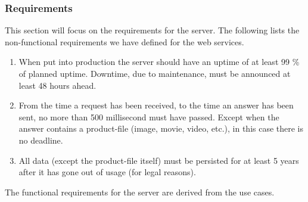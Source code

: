 \subsubsection{Requirements}
\label{s_serviceRequirements}
This section will focus on the requirements for the server. The following lists the non-functional requirements we have defined for the web services.

\begin{enumerate}[label=NFR-\arabic*]
	\item When put into production the server should have an uptime of at least 99 \% of planned uptime. Downtime, due to maintenance, must be announced at least 48 hours ahead.
	
	\item From the time a request has been received, to the time an answer has been sent, no more than 500 millisecond must have passed. Except when the answer contains a product-file (image, movie, video, etc.), in this case there is no deadline.
	
	\item All data (except the product-file itself) must be persisted for at least 5 years after it has gone out of usage (for legal reasons).
\end{enumerate}

The functional requirements for the server are derived from the use cases.


